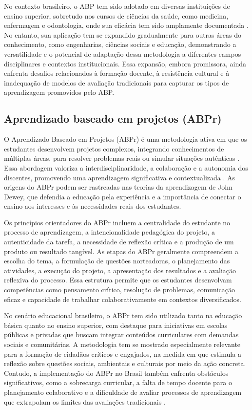 No contexto brasileiro, o ABP tem sido adotado em diversas instituições de ensino superior, sobretudo nos cursos de ciências da saúde, como medicina, enfermagem e odontologia, onde sua eficácia tem sido amplamente documentada \cite{SCHMIDT2001}. No entanto, sua aplicação tem se expandido gradualmente para outras áreas do conhecimento, como engenharias, ciências sociais e educação, demonstrando a versatilidade e o potencial de adaptação dessa metodologia a diferentes campos disciplinares e contextos institucionais. Essa expansão, embora promissora, ainda enfrenta desafios relacionados à formação docente, à resistência cultural e à inadequação de modelos de avaliação tradicionais para capturar os tipos de aprendizagem promovidos pelo ABP.

\subsection{Aprendizado baseado em projetos (ABPr)}
\label{subsec:abpr_descricao}

O Aprendizado Baseado em Projetos (ABPr) é uma metodologia ativa em que os estudantes desenvolvem projetos complexos, integrando conhecimentos de múltiplas áreas, para resolver problemas reais ou simular situações autênticas \cite{THOMAS2000}. Essa abordagem valoriza a interdisciplinaridade, a colaboração e a autonomia dos discentes, promovendo uma aprendizagem significativa e contextualizada \cite{BARRON1998}. As origens do ABPr podem ser rastreadas nas teorias da aprendizagem de John Dewey, que defendia a educação pela experiência e a importância de conectar o ensino aos interesses e às necessidades reais dos estudantes.

Os princípios orientadores do ABPr incluem a centralidade do estudante no processo de aprendizagem, a intencionalidade pedagógica do projeto, a autenticidade da tarefa, a necessidade de reflexão crítica e a produção de um produto ou resultado tangível. As etapas do ABPr geralmente compreendem a escolha do tema, a formulação de questões norteadoras, o planejamento das atividades, a execução do projeto, a apresentação dos resultados e a avaliação reflexiva do processo. Essa estrutura permite que os estudantes desenvolvam competências como pensamento crítico, resolução de problemas, comunicação eficaz e capacidade de trabalhar colaborativamente em contextos diversificados.

No cenário educacional brasileiro, o ABPr tem sido utilizado tanto na educação básica quanto no ensino superior, com destaque para iniciativas em escolas públicas e privadas que buscam integrar conteúdos curriculares com demandas sociais e comunitárias. A metodologia tem se mostrado especialmente relevante para a formação de cidadãos críticos e engajados, na medida em que estimula a reflexão sobre questões sociais, ambientais e culturais por meio da ação concreta. Contudo, a implementação do ABPr no Brasil também enfrenta obstáculos significativos, como a sobrecarga curricular, a falta de tempo docente para o planejamento colaborativo e a dificuldade de avaliar processos de aprendizagem que extrapolam os limites das avaliações tradicionais \cite{THOMAS2000}.

